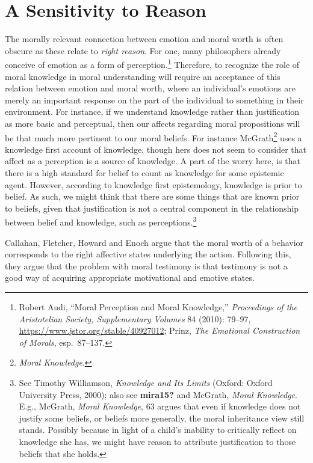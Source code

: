 \documentclass[phdthesis,12pt,final]{wuthesis}
\theoremstyle{definition}
\theoremstyle{definition}
\theoremstyle{definition}
\theoremstyle{definition}
\theoremstyle{remark}
\begin{document}
\section{A Sensitivity to Reason}\label{a-sensitivity-to-reason}

The morally relevant connection between emotion and moral worth is often obscure as these relate to \emph{right reason}. For one, many philosophers already conceive of emotion as a form of perception.\footnote{Robert Audi, {``Moral {Perception} and {Moral Knowledge},''} \emph{Proceedings of the Aristotelian Society, Supplementary Volumes} 84 (2010): 79--97, \url{https://www.jstor.org/stable/40927012}; Prinz, \emph{The {Emotional Construction} of {Morals}}, esp.~87--137.} Therefore, to recognize the role of moral knowledge in moral understanding will require an acceptance of this relation between emotion and moral worth, where an individual's emotions are merely an important response on the part of the individual to something in their environment. For instance, if we understand knowledge rather than justification as more basic and perceptual, then our affects regarding moral propositions will be that much more pertinent to our moral beliefs. For instance McGrath\footnote{\emph{Moral {Knowledge}}.} uses a knowledge first account of knowledge, though hers does not seem to consider that affect as a perception is a source of knowledge. A part of the worry here, is that there is a high standard for belief to count as knowledge for some epistemic agent. However, according to knowledge first epistemology, knowledge is prior to belief. As such, we might think that there are some things that are known prior to beliefs, given that justification is not a central component in the relationship between belief and knowledge, such as perceptions.\footnote{See Timothy Williamson, \emph{Knowledge and {Its Limits}} (Oxford: Oxford University Press, 2000); also see \textbf{mira15?} and McGrath, \emph{Moral {Knowledge}}. E.g., McGrath, \emph{Moral {Knowledge}}, 63 argues that even if knowledge does not justify some beliefs, or beliefs more generally, the moral inheritance view still stands. Possibly because in light of a child's inability to critically reflect on knowledge she has, we might have reason to attribute justification to those beliefs that she holds.}

Callahan, Fletcher, Howard and Enoch argue that the moral worth of a behavior corresponds to the right affective states underlying the action. Following this, they argue that the problem with moral testimony is that testimony is not a good way of acquiring appropriate motivational and emotive states.
\end{document}
